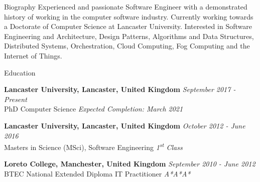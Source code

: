 \documentclass{resume} %
\begin{document}
	
\begin{rSection}{Biography}
	Experienced and passionate Software Engineer with a demonstrated history of working in the computer software industry. Currently working towards a Doctorate of Computer Science at Lancaster University. Interested in Software Engineering and Architecture, Design Patterns, Algorithms and Data Structures,  Distributed Systems, Orchestration, Cloud Computing, Fog Computing and the Internet of Things.
\end{rSection}	



\begin{rSection}{Education}

{\bf Lancaster University, Lancaster, United Kingdom} \hfill {\em September 2017 - Present} 
\\ PhD Computer Science  \hfill {\em Expected Completion: March 2021}

{\bf Lancaster University, Lancaster, United Kingdom} \hfill {\em October 2012 - June 2016} 
\\ Masters in Science (MSci), Software Engineering \hfill {\em 1\textsuperscript{st} Class }

{\bf Loreto College,  Manchester, United Kingdom} \hfill {\em September 2010 - June 2012}
\\ BTEC National Extended Diploma IT Practitioner \hfill {\em A*A*A*}
\end{rSection}
\end{document}
